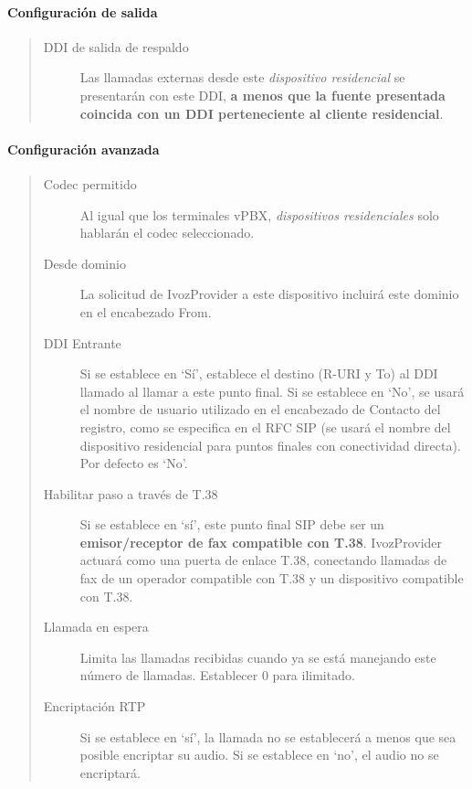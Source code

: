 \documentclass[letterpaper,10pt,spanish]{sphinxmanual}
\begin{document}
\paragraph{Configuración de salida}
\label{administration_portal/client/residential/residential_devices:outgoing-configuration}\begin{quote}
\begin{description}
\item[{DDI de salida de respaldo}] \leavevmode
Las llamadas externas desde este \emph{dispositivo residencial} se presentarán con este DDI, \textbf{a menos que la fuente presentada coincida con un DDI perteneciente al cliente residencial}.

\end{description}
\end{quote}


\paragraph{Configuración avanzada}
\label{administration_portal/client/residential/residential_devices:advanced-configuration}\begin{quote}
\begin{description}
\item[{Codec permitido}] \leavevmode
Al igual que los terminales vPBX, \emph{dispositivos residenciales} solo hablarán el codec seleccionado.

\item[{Desde dominio}] \leavevmode
La solicitud de IvozProvider a este dispositivo incluirá este dominio en el encabezado From.

\item[{DDI Entrante}] \leavevmode
Si se establece en `Sí', establece el destino (R-URI y To) al DDI llamado al llamar a este punto final. Si se establece en `No', se usará el nombre de usuario utilizado en el encabezado de Contacto del registro, como se especifica en el RFC SIP (se usará el nombre del dispositivo residencial para puntos finales con conectividad directa). Por defecto es `No'.

\item[{Habilitar paso a través de T.38}] \leavevmode
Si se establece en `sí', este punto final SIP debe ser un \textbf{emisor/receptor de fax compatible con T.38}. IvozProvider actuará como una puerta de enlace T.38, conectando llamadas de fax de un operador compatible con T.38 y un dispositivo compatible con T.38.

\item[{Llamada en espera}] \leavevmode
Limita las llamadas recibidas cuando ya se está manejando este número de llamadas. Establecer 0 para ilimitado.

\item[{Encriptación RTP}] \leavevmode
Si se establece en `sí', la llamada no se establecerá a menos que sea posible encriptar su audio. Si se establece en `no', el audio no se encriptará.

\end{description}
\end{quote}
\end{document}
